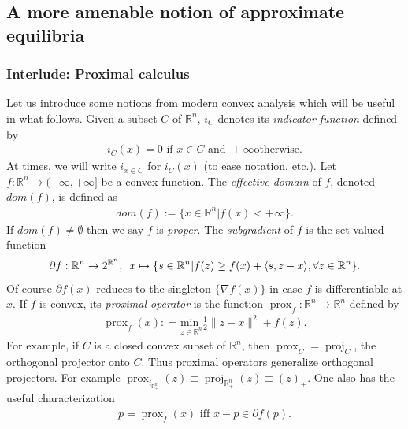 \documentclass{article} %
\DeclareMathOperator{\proj}{proj}
\DeclareMathOperator{\prox}{prox}
\begin{document}
\subsection{A more amenable notion of approximate equilibria}
\subsubsection{Interlude: Proximal calculus}
Let us introduce some notions from modern convex analysis which will be
useful in what follows. Given a subset $C$ of $\mathbb{R}^n$,
$i_C$ denotes its \textit{indicator function} defined by
\begin{eqnarray}
  i_C(x) = 0 \text{ if } x \in C\text{ and }+\infty\text{
    otherwise.}
\end{eqnarray}
At times, we will write $i_{x \in C}$ for $i_C(x)$ (to ease notation,
etc.). Let $f : \mathbb{R}^n \rightarrow (-\infty, +\infty]$ be a
  convex function. The \textit{effective domain} of $f$, denoted
  $dom(f)$, is defined as
\begin{eqnarray}
  dom(f) := \{x \in \mathbb{R}^n | f(x) < +\infty\}.
\end{eqnarray}
 If $dom(f) \ne \emptyset$ then we say $f$ is \textit{proper}.
The \textit{subgradient} of $f$ is the set-valued function
\begin{eqnarray}
\partial f: \mathbb{R}^n \rightarrow 2^{\mathbb{R}^n}, \hspace{.5em} x \mapsto
\{s\in \mathbb{R}^n | f(z)  \ge f(x) + \langle s, z - x\rangle, \forall
z \in \mathbb{R}^n\}.
\end{eqnarray}
Of course $\partial f(x)$ reduces to the singleton $\{\nabla f(x)\}$
in case $f$ is differentiable at $x$. If $f$ is convex, its
\textit{proximal operator} is the function $\prox_f: \mathbb{R}^n
\rightarrow \mathbb{R}^n$ defined by
\begin{eqnarray}
  \prox_f(x): = \underset{z \in \mathbb{R}^n}{\text{min }}\frac{1}{2}\|z
  - x\|^2 + f(z).
\end{eqnarray}
For example, if $C$ is a closed convex subset of $\mathbb{R}^n$, then
$\prox_C = \proj_C$, the orthogonal projector onto $C$. Thus proximal
operators generalize orthogonal projectors. For example
$\prox_{i_{\mathbb{R}^n_+}}(z) \equiv \proj_{\mathbb{R}^n_+}(z) \equiv
(z)_+$. One also has the useful characterization
\begin{eqnarray}
  p = \prox_f(x)\text{ iff } x - p \in \partial f(p).
\end{eqnarray}
\end{document}
